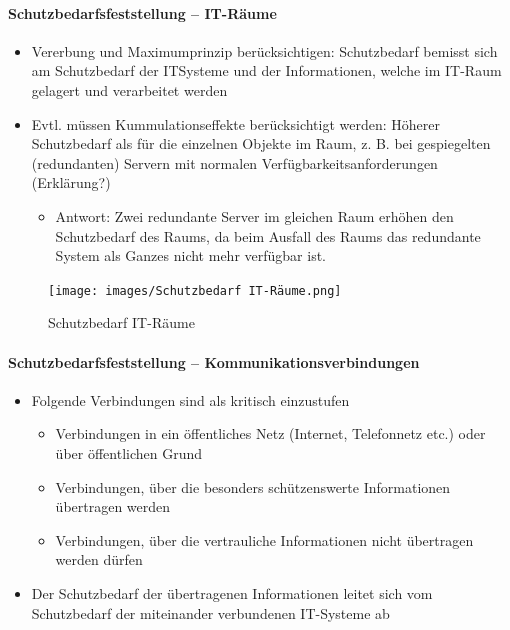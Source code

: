 \documentclass[10pt,a4paper]{article}
\begin{document}
\paragraph*{Schutzbedarfsfeststellung – IT-Räume}
\begin{itemize}[noitemsep,topsep=0pt,leftmargin=*]
    \item Vererbung und Maximumprinzip berücksichtigen: Schutzbedarf bemisst sich am Schutzbedarf der ITSysteme und der Informationen, welche im IT-Raum gelagert und verarbeitet werden
    \item Evtl. müssen Kummulationseffekte berücksichtigt werden: Höherer Schutzbedarf als für die einzelnen Objekte im Raum, z. B. bei gespiegelten (redundanten) Servern mit normalen Verfügbarkeitsanforderungen (Erklärung?)
    \begin{itemize}[noitemsep,topsep=0pt,leftmargin=*]
        \item Antwort: Zwei redundante Server im gleichen Raum erhöhen den Schutzbedarf des Raums, da beim Ausfall des Raums das redundante System als Ganzes nicht mehr verfügbar ist.
    \end{itemize}
\end{itemize}

\begin{figure}[H]
    \begin{center}
    \texttt{[image: images/Schutzbedarf IT-Räume.png]}
    \caption{Schutzbedarf IT-Räume}
    \label{Schutzbedarf IT-Räume}
    \end{center}
\end{figure}

\paragraph*{Schutzbedarfsfeststellung – Kommunikationsverbindungen}
\begin{itemize}[noitemsep,topsep=0pt,leftmargin=*]
    \item Folgende Verbindungen sind als kritisch einzustufen
    \begin{itemize}[noitemsep,topsep=0pt,leftmargin=*]
        \item Verbindungen in ein öffentliches Netz (Internet, Telefonnetz etc.) oder über öffentlichen Grund
        \item Verbindungen, über die besonders schützenswerte Informationen übertragen werden
        \item Verbindungen, über die vertrauliche Informationen nicht übertragen werden dürfen
    \end{itemize}
    \item Der Schutzbedarf der übertragenen Informationen leitet sich vom Schutzbedarf der miteinander verbundenen IT-Systeme ab
\end{itemize}
\end{document}
